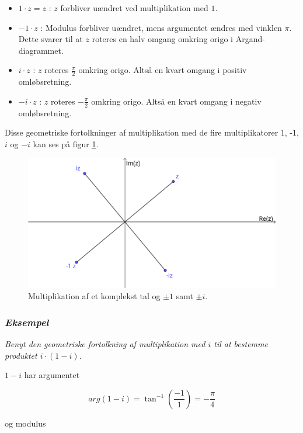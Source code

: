 \documentclass[a4paper, 12pt,titlepage]{article}
\begin{document}
\begin{itemize}
\item \(1 \cdot z= z\) : \(z\) forbliver uændret ved multiplikation med \(1\).

\item \(-1 \cdot z\) : Modulus forbliver uændret, mens argumentet ændres med vinklen \(\pi\). Dette svarer til at \(z\) roteres en halv omgang omkring origo i Argand-diagrammet.

\item \(i \cdot z\) : \(z\) roteres \(\frac{\pi}{2}\) omkring origo. Altså en kvart omgang i positiv omløbsretning.

\item \(-i \cdot z\) : \(z\) roteres \(-\frac{\pi}{2}\) omkring origo. Altså en kvart omgang i negativ omløbsretning.
\end{itemize}

Disse geometriske fortolkninger af multiplikation med de fire multiplikatorer 1, -1, \(i\) og \(-i\) kan ses på figur \ref{multiplikation}.

\begin{figure}[htbp]
\centering
\includegraphics[width=.9\linewidth]{./img/multiplikation.png}
\caption{\label{multiplikation}Multiplikation af et komplekst tal og \(\pm 1\) samt \(\pm i\).}
\end{figure}

\subsubsection*{\emph{Eksempel}}
\label{sec:org19a00ff}
\emph{Benyt den geometriske fortolkning af multiplikation med \(i\) til at bestemme produktet \(i \cdot (1-i)\).}

\(1-i\) har argumentet 

$$arg(1-i) = \tan^{-1}\left( \frac{-1}{1}\right) = -\frac{\pi}{4}$$

og modulus
\end{document}
